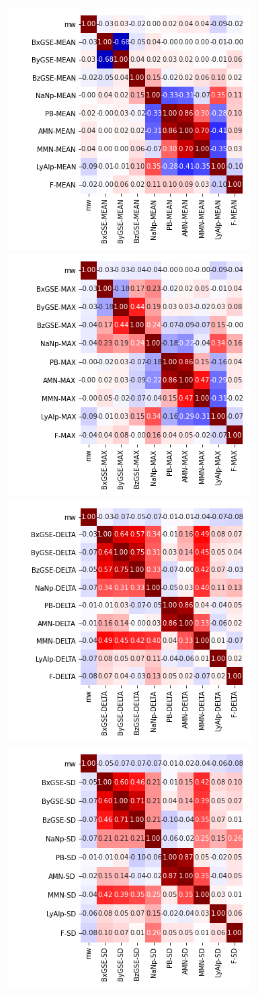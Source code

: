 \documentclass[12pt]{article}
\begin{document}
\newpage

\begin{figure}
   \includegraphics[width=0.57\textwidth]{seven-eight_mean_2.png}
   \includegraphics[width=0.57\textwidth]{seven-eight_max_2.png}
   \includegraphics[width=0.57\textwidth]{seven-eight_delta_2.png}
   \includegraphics[width=0.57\textwidth]{seven-eight_sd_2.png}
\end{figure}
\end{document}
